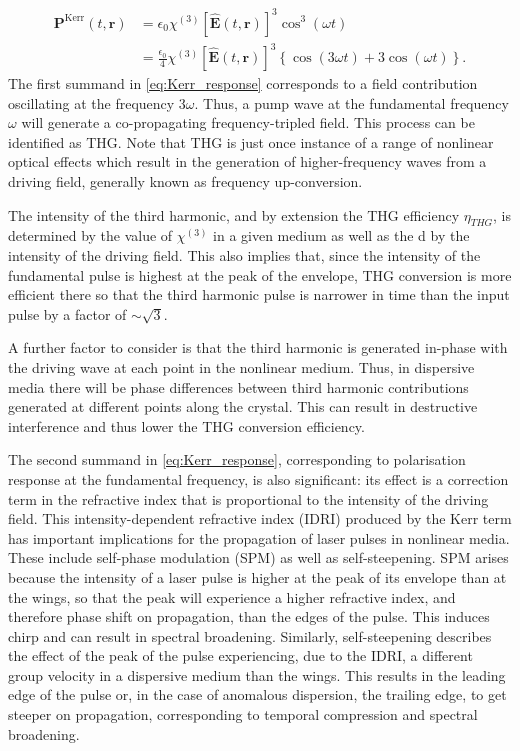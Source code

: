 \documentclass[a4paper]{jpconf}
\begin{document}
\begin{align}\label{eq:Kerr_response}
\nonumber  \mathbf{P}^\text{Kerr}(t,\mathbf{r}) &= \epsilon_0 \chi^{(3)} [\hat{\mathbf{E}}(t, \mathbf{r})]^3 \cos^3(\omega t) \\ &= \frac{\epsilon_0}{4}  \chi^{(3)} [\hat{\mathbf{E}}(t, \mathbf{r})]^3 \left\{ \cos (3\omega t) +  3 \cos(\omega t)\right\}.
\end{align}
The first summand in \eqref{eq:Kerr_response} corresponds to a field contribution oscillating at the frequency $3 \omega$. Thus, a pump wave at the fundamental frequency $\omega$ will generate a co-propagating frequency-tripled field. This process can be identified as THG. Note that THG is just once instance of a range of nonlinear optical effects which result in the generation of higher-frequency waves from a driving field, generally known as frequency up-conversion. \par 
The intensity of the third harmonic, and by extension the THG efficiency $\eta_{THG}$, is determined by the value of $\chi^{(3)}$ in a given medium as well as the d by the intensity of the driving field. This also implies that, since the intensity of the fundamental pulse is highest at the peak of the envelope, THG conversion is more efficient there so that the third harmonic pulse is narrower in time than the input pulse by a factor of $\sim\sqrt{3}$. \par 
 A further factor to consider is that the third harmonic is generated in-phase with the driving wave at each point in the nonlinear medium. Thus, in dispersive media there will be phase differences between third harmonic contributions generated at different points along the crystal. This can result in destructive interference and thus lower the THG conversion efficiency. \par 
The second summand in \eqref{eq:Kerr_response}, corresponding to polarisation response at the fundamental frequency, is also significant: its effect is a correction term in the refractive index that is proportional to the intensity of the driving field. This intensity-dependent refractive index (IDRI) produced by the Kerr term has important implications for the propagation of laser pulses in nonlinear media. These include self-phase modulation (SPM) as well as self-steepening. SPM arises because the intensity of a laser pulse is higher at the peak of its envelope than at the wings, so that the peak will experience a higher refractive index, and therefore phase shift on propagation, than the edges of the pulse. This induces chirp and can result in spectral broadening. Similarly, self-steepening describes the effect of the peak of the pulse experiencing, due to the IDRI, a different group velocity in a dispersive medium than the wings. This results in the leading edge of the pulse or, in the case of anomalous dispersion, the trailing edge, to get steeper on propagation, corresponding to temporal compression and spectral broadening. \par 
\end{document}
